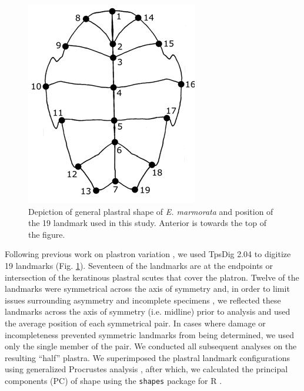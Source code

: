 \documentclass[12pt,letterpaper]{article}
\begin{document}
\begin{figure}[h]
  \centering
  \includegraphics[height = 0.5\textheight, width = \textwidth, keepaspectratio = true]{figure/plastra}
  \caption{Depiction of general plastral shape of \textit{E. marmorata} and position of the 19 landmark used in this study. Anterior is towards the top of the figure.}
  \label{fig:plastra}
\end{figure}


Following previous work on plastron variation \citep{Angielczyk2007,Angielczyk2011,Angielczyk2013a}, we used TpsDig 2.04 \citep{Rohlf2005} to digitize 19 landmarks (Fig. \ref{fig:plastra}). Seventeen of the landmarks are at the endpoints or intersection of the keratinous plastral scutes that cover the platron. Twelve of the landmarks were symmetrical across the axis of symmetry and, in order to limit issues surrounding asymmetry and incomplete specimens \citep{Klingenberg2002}, we reflected these landmarks across the axis of symmetry (i.e. midline) prior to analysis and used the average position of each symmetrical pair. In cases where damage or incompleteness prevented symmetric landmarks from being determined, we used only the single member of the pair. We conducted all subsequent analyses on the resulting ``half'' plastra. We superimposed the plastral landmark configurations using generalized Procrustes analysis \citep{Dryden1998a}, after which, we calculated the principal components (PC) of shape using the \texttt{shapes} package for R \citep{2013,Dryden2013}.
\end{document}
